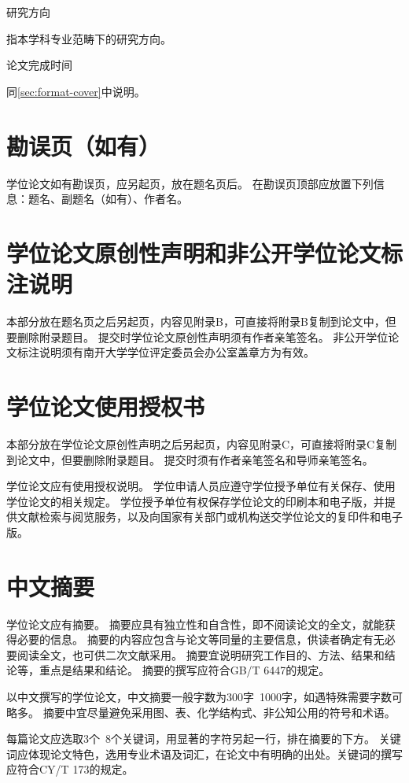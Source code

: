 {\heiti 研究方向}

指本学科专业范畴下的研究方向。

{\heiti 论文完成时间}

同\ref{sec:format-cover}中说明。

\section{勘误页（如有）}

学位论文如有勘误页，应另起页，放在题名页后。
在勘误页顶部应放置下列信息：题名、副题名（如有）、作者名。

\section{学位论文原创性声明和非公开学位论文标注说明}

本部分放在题名页之后另起页，内容见附录B，可直接将附录B复制到论文中，但要删除附录题目。
提交时学位论文原创性声明须有作者亲笔签名。
非公开学位论文标注说明须有南开大学学位评定委员会办公室盖章方为有效。

\section{学位论文使用授权书}

本部分放在学位论文原创性声明之后另起页，内容见附录C，可直接将附录C复制到论文中，但要删除附录题目。
提交时须有作者亲笔签名和导师亲笔签名。

学位论文应有使用授权说明。
学位申请人员应遵守学位授予单位有关保存、使用学位论文的相关规定。
学位授予单位有权保存学位论文的印刷本和电子版，并提供文献检索与阅览服务，以及向国家有关部门或机构送交学位论文的复印件和电子版。

\section{中文摘要}

学位论文应有摘要。
摘要应具有独立性和自含性，即不阅读论文的全文，就能获得必要的信息。
摘要的内容应包含与论文等同量的主要信息，供读者确定有无必要阅读全文，也可供二次文献采用。
摘要宜说明研究工作目的、方法、结果和结论等，重点是结果和结论。
摘要的撰写应符合GB/T 6447的规定。

以中文撰写的学位论文，中文摘要一般字数为300字~1000字，如遇特殊需要字数可略多。
摘要中宜尽量避免采用图、表、化学结构式、非公知公用的符号和术语。

每篇论文应选取3个~8个关键词，用显著的字符另起一行，排在摘要的下方。
关键词应体现论文特色，选用专业术语及词汇，在论文中有明确的出处。关键词的撰写应符合CY/T 173的规定。

